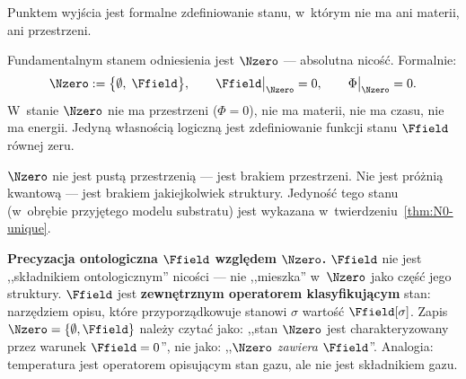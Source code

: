 Punktem wyj\'scia jest formalne zdefiniowanie stanu,
w~kt\'orym nie ma ani materii, ani przestrzeni.

\begin{axiom}[Nico\'s\'c]\label{ax:N0}
Fundamentalnym stanem odniesienia jest $\Nzero$ ---
absolutna nico\'s\'c. Formalnie:
\begin{equation}
    \Nzero := \bigl\{\emptyset,\;\Ffield\bigr\},
    \qquad
    \Ffield\big|_{\Nzero} = 0,
    \qquad
    \Phi\big|_{\Nzero} = 0.
\end{equation}
W~stanie $\Nzero$ nie ma przestrzeni ($\Phi = 0$), nie ma materii,
nie ma czasu, nie ma energii. Jedyn\k{a} w\l{}asno\'sci\k{a} logiczn\k{a}
jest zdefiniowanie funkcji stanu $\Ffield$ r\'ownej zeru.
\end{axiom}

$\Nzero$ nie jest pust\k{a} przestrzeni\k{a} --- jest brakiem
przestrzeni. Nie jest pr\'o\.zni\k{a} kwantow\k{a} --- jest brakiem
jakiejkolwiek struktury. Jedyno\'s\'c tego stanu (w~obr\k{e}bie
przyj\k{e}tego modelu substratu) jest wykazana
w~twierdzeniu~\ref{thm:N0-unique}.

\medskip\noindent\textbf{Precyzacja ontologiczna $\Ffield$
wzgl\k{e}dem $\Nzero$.}\;
$\Ffield$ nie jest ,,sk\l{}adnikiem ontologicznym'' nico\'sci ---
nie ,,mieszka'' w~$\Nzero$ jako cz\k{e}\'s\'c jego struktury.
$\Ffield$ jest \textbf{zewn\k{e}trznym operatorem klasyfikuj\k{a}cym}
stan: narz\k{e}dziem opisu, kt\'ore przyporz\k{a}dkowuje stanowi
$\sigma$ warto\'s\'c $\Ffield[\sigma]$.
Zapis $\Nzero = \{\emptyset, \Ffield\}$ nale\.zy czyta\'c jako:
,,stan $\Nzero$ jest charakteryzowany przez warunek $\Ffield = 0$'',
nie jako: ,,$\Nzero$ \emph{zawiera} $\Ffield$''.
Analogia: temperatura jest operatorem opisuj\k{a}cym stan gazu,
ale nie jest sk\l{}adnikiem gazu.

